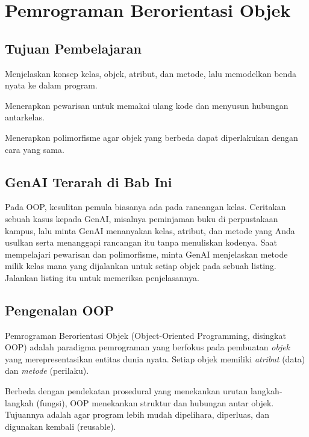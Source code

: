 \chapter{Pemrograman Berorientasi Objek}

\section*{Tujuan Pembelajaran}
\begin{daftarrapat}
  \item Menjelaskan konsep kelas, objek, atribut, dan metode, lalu memodelkan benda nyata ke dalam program.
  \item Menerapkan pewarisan untuk memakai ulang kode dan menyusun hubungan antarkelas.
  \item Menerapkan polimorfisme agar objek yang berbeda dapat diperlakukan dengan cara yang sama.
\end{daftarrapat}

\section*{GenAI Terarah di Bab Ini}

Pada OOP, kesulitan pemula biasanya ada pada rancangan kelas. Ceritakan sebuah kasus kepada GenAI, misalnya peminjaman buku di perpustakaan kampus, lalu minta GenAI menanyakan kelas, atribut, dan metode yang Anda usulkan serta menanggapi rancangan itu tanpa menuliskan kodenya. Saat mempelajari pewarisan dan polimorfisme, minta GenAI menjelaskan metode milik kelas mana yang dijalankan untuk setiap objek pada sebuah listing. Jalankan listing itu untuk memeriksa penjelasannya.

\section{Pengenalan OOP}

Pemrograman Berorientasi Objek (Object-Oriented Programming, disingkat OOP) adalah paradigma pemrograman yang berfokus pada pembuatan \emph{objek} yang merepresentasikan entitas dunia nyata. Setiap objek memiliki \emph{atribut} (data) dan \emph{metode} (perilaku).

Berbeda dengan pendekatan prosedural yang menekankan urutan langkah-langkah (fungsi), OOP menekankan struktur dan hubungan antar objek. Tujuannya adalah agar program lebih mudah dipelihara, diperluas, dan digunakan kembali (reusable).


